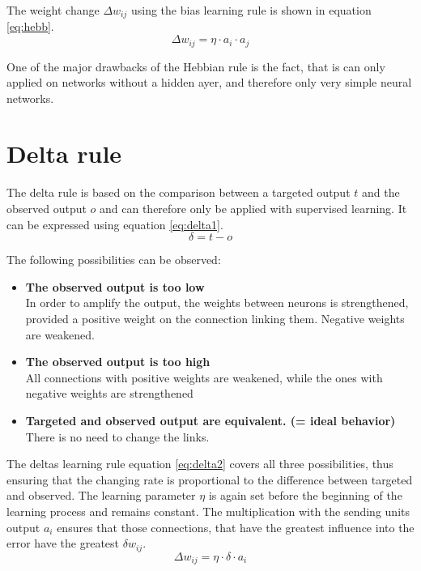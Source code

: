 \documentclass[10pt,a4paper,DIV=11]{scrreprt}
\begin{document}
The weight change $\Delta w_{ij}$ using the bias learning rule is shown in equation \eqref{eq:hebb}.
\begin{equation}
\Delta w_{ij} = \eta \cdot a_i \cdot a_j
\label{eq:hebb}
\end{equation}

One of the major drawbacks of the Hebbian rule is the fact, that is can only applied on networks without a hidden ayer, and therefore only very simple neural networks.

\section{Delta rule}
The delta rule is based on the comparison between a targeted output $t$ and the observed output $o$ and can therefore only be applied with supervised learning.
It can be expressed using equation \eqref{eq:delta1}.
\begin{equation}
\delta = t - o
\label{eq:delta1}
\end{equation}

The following possibilities can be observed:
\begin{itemize}
\item \textbf{The observed output is too low}\\
In order to amplify the output, the weights between neurons is strengthened, provided a positive weight on the connection linking them. Negative weights are weakened.
\item \textbf{The observed output is too high}\\
All connections with positive weights are weakened, while the ones with negative weights are strengthened 
\item \textbf{Targeted and observed output are equivalent. (= ideal behavior)}\\ There is no need to change the links.
\end{itemize}

The deltas learning rule equation \eqref{eq:delta2} covers all three possibilities, thus ensuring that the changing rate is proportional to the difference between targeted and observed. The learning parameter $\eta$ is again set before the beginning of the learning process and remains constant. The multiplication with the sending units output $a_i$ ensures that those connections, that have the greatest influence into the error have the greatest $\delta w_{ij}$.
\begin{equation}
\Delta w_{ij} = \eta \cdot \delta \cdot a_i
\label{eq:delta2}
\end{equation}
\end{document}
